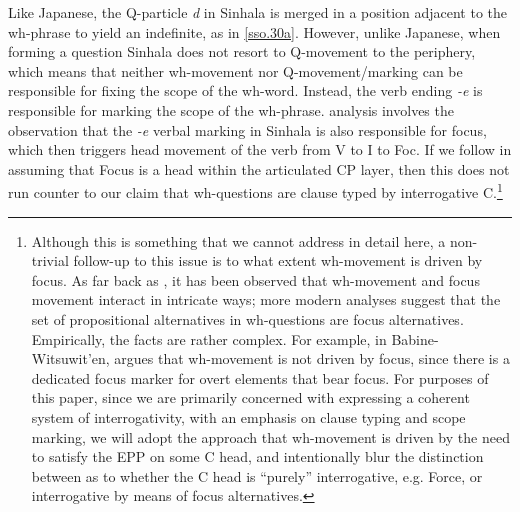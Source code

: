 \documentclass[11pt]{article}
\begin{document}
Like Japanese, the Q-particle \textit{d\textschwa} in Sinhala is merged in a position adjacent to the wh-phrase to yield an indefinite, as in \ref{sso.30a}. However, unlike Japanese, when forming a question Sinhala does not resort to Q-movement to the periphery, which means that neither wh-movement nor Q-movement/marking can be responsible for fixing the scope of the wh-word. Instead, the verb ending \textit{-e} is responsible for marking the scope of the wh-phrase. \cite{slade:2011} analysis involves the observation that the \textit{-e} verbal marking in Sinhala is also responsible for focus, which then triggers head movement of the verb from V to I to Foc. If we follow \cite{rizzi:1997} in assuming that Focus is a head within the articulated CP layer, then this does not run counter to our claim that wh-questions are clause typed by interrogative C.\footnote{Although this is something that we cannot address in detail here, a non-trivial follow-up to this issue is to what extent wh-movement is driven by focus. As far back as \cite{huang:1982}, it has been observed that wh-movement and focus movement interact in intricate ways; more modern analyses \citep{beck:2006} suggest that the set of propositional alternatives in wh-questions are focus alternatives. Empirically, the facts are rather complex. For example, in Babine-Witsuwit'en, \cite{denham:2000} argues that wh-movement is not driven by focus, since there is a dedicated focus marker for overt elements that bear focus. For purposes of this paper, since we are primarily concerned with expressing a coherent system of interrogativity, with an emphasis on clause typing and scope marking, we will adopt the approach that wh-movement is driven by the need to satisfy the EPP on some C head, and intentionally blur the distinction between as to whether the C head is ``purely'' interrogative, e.g. Force, or interrogative by means of focus alternatives.}
\end{document}
